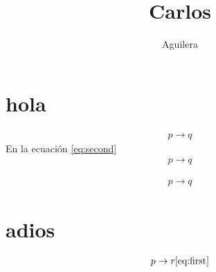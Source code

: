 \documentclass[a4paper]{article}
\title{Carlos}
\author{Aguilera}
\begin{document}
\section{hola}
	\begin{align}
			p \to q \label{eq:first}
	\end{align}
	En la ecuación \ref{eq:second}
	\begin{align}
		p \to q \label{eq:second}
	\end{align}

	\begin{align}
		p \to q \label{eq:third}
	\end{align}

\section{adios}
\begin{align*}
p \to r\label{seccion2}\ref{eq:first}
\end{align*}
\end{document}
